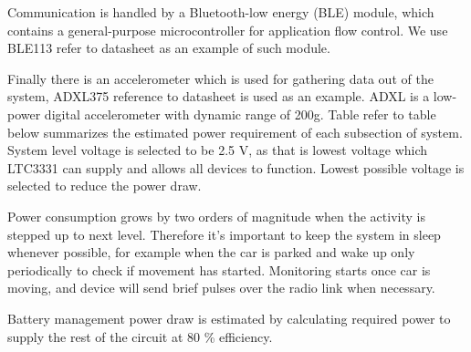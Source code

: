 Communication is handled by a Bluetooth-low energy (BLE) module, which contains a general-purpose microcontroller for application flow control.
We use BLE113 {\color{red} refer to datasheet} as an example of such module.

Finally there is an accelerometer which is used for gathering data out of the system, ADXL375 {\color{red} reference to datasheet} is used as an example. ADXL is a low-power digital accelerometer with dynamic range of 200g. Table {\color{red} refer to table below} summarizes the estimated power requirement of each subsection of system. System level voltage is selected to be 2.5 V, as that is lowest voltage which LTC3331 can supply and allows all devices to function. Lowest possible voltage is selected to reduce the power draw.

\begin{table}[htb]
\caption{\label{power_consumption_table}}
\begin{center}
\end{center}
\end{table}

Power consumption grows by two orders of magnitude when the activity is stepped up to next level. Therefore it's important to keep the system in sleep whenever possible, for example when the car is parked and wake up only periodically to check if movement has started. Monitoring starts once car is moving, and device will send brief pulses over the radio link when necessary.

Battery management power draw is estimated by calculating required power to supply the rest of the circuit at 80 \% efficiency.


